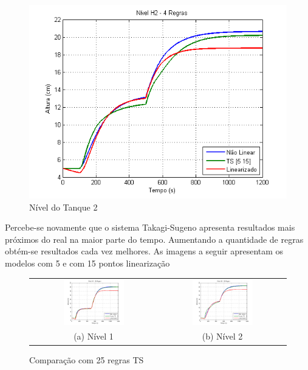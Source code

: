 \begin{figure}[H]
	\centering
	\includegraphics[width=\textwidth]{img/h2_ts2_nm.png}
	\caption{\small Nível do Tanque 2}
	\label{figH2TS2_nm}
\end{figure}

Percebe-se novamente que o sistema Takagi-Sugeno apresenta resultados mais próximos do real na maior parte do tempo. Aumentando a quantidade de regras obtém-se resultados cada vez melhores. As imagens a seguir apresentam os modelos com 5 e com 15 pontos linearização

\begin{figure}[H]
	\centering
	\begin{tabular}{cc}
		\includegraphics[width=0.5\textwidth,keepaspectratio]{img/h1_ts5_nm.png} &
		\includegraphics[width=0.5\textwidth,keepaspectratio]{img/h2_ts5_nm.png} \\
		(a) Nível 1 &
		(b) Nível 2
	\end{tabular}
	\caption{\label{imgTS5_nm} Comparação com 25 regras TS}
\end{figure}

